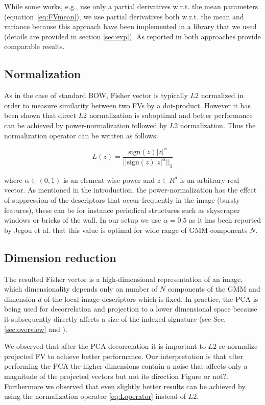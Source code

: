 \documentclass[table]{article} %
\newcommand\abs[1]{\left|#1\right|}
\newcommand\norm[1]{||#1||_2}
\begin{document}
		While some works, e.g.\cite{Perronnin2010}, use only a partial derivatives w.r.t. the mean parameters (equation~\eqref{eq:FVmean}), we use partial derivatives both w.r.t. the mean and variance because this approach have been implemented in a library that we used (details are provided in section \ref{sec:exp}). As reported in \cite{Jegou2010} both approaches provide comparable results.

		\subsection{Normalization}
			As in the case of standard BOW, Fisher vector is typically $L2$ normalized in order to measure similarity between two FVs by a dot-product. However it has been shown that direct $L2$ normalization is suboptimal and better performance can be achieved by power-normalization followed by $L2$ normalization. Thus the normalization operator can be written as follows:
			
			\begin{equation}
				L(z)=\dfrac{\text{sign} (z) \abs{z}^\alpha}{\norm{\text{sign}(z) \abs{z}^\alpha}}
				\label{eq:Loperator}
			\end{equation}

			\noindent
			where $\alpha \in (0,1)$ is an element-wise power and $z \in R^d$ is an arbitrary real vector. As mentioned in the introduction, the power-normalization has the effect of suppression of the descriptors that occur frequently in the image (bursty features), these can be for instance periodical structures such as skyscraper windows or bricks of the wall. In our setup we use $\alpha=0.5$ as it has been reported by Jegou et al. \cite{Jegou2012HAL} that this value is optimal for wide range of GMM components $N$.

		\subsection{Dimension reduction}
			The resulted Fisher vector is a high-dimensional representation of an image, which dimensionality depends only on number of $N$ components of the GMM and dimension $d$ of the local image descriptors which is fixed. In practice, the PCA is being used for decorrelation and projection to a lower dimensional space because it subsequently directly affects a size of the indexed signature (see Sec. \ref{sec:overview} and \cite{Jegou2011}).

			We observed that after the PCA decorrelation it is important to $L2$ re-normalize projected FV to achieve better performance. Our interpretation is that after performing the PCA the higher dimensions contain a noise that affects only a magnitude of the projected vectors but not its direction \textcolor{myRed}{Figure or not?}. Furthermore we observed that even slightly better results can be achieved by using the normalization operator \eqref{eq:Loperator} instead of $L2$.
\end{document}
